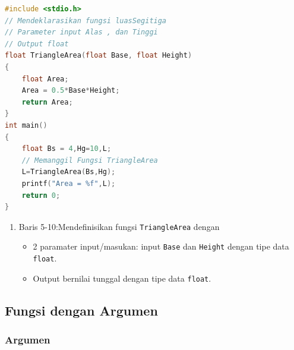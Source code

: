 \begin{lstlisting}[language=c]
	#include <stdio.h>
// Mendeklarasikan fungsi luasSegitiga
// Parameter input Alas , dan Tinggi
// Output float
float TriangleArea(float Base, float Height)
{
	float Area;
	Area = 0.5*Base*Height;
	return Area;
}
int main()
{
	float Bs = 4,Hg=10,L;
    // Memanggil Fungsi TriangleArea
	L=TriangleArea(Bs,Hg);
	printf("Area = %f",L);
	return 0;
}
\end{lstlisting}
\begin{enumerate}
    \item Baris 5-10:Mendefinisikan fungsi \verb*|TriangleArea| dengan
          \begin{itemize}
              \item 2 paramater input/masukan:
                    input \verb*|Base| dan \verb*|Height|  dengan tipe data \verb*|float|.
              \item Output bernilai tunggal dengan tipe data \verb*|float|.
          \end{itemize}
\end{enumerate}
\subsection{Fungsi dengan Argumen}

\subsubsection{Argumen}



